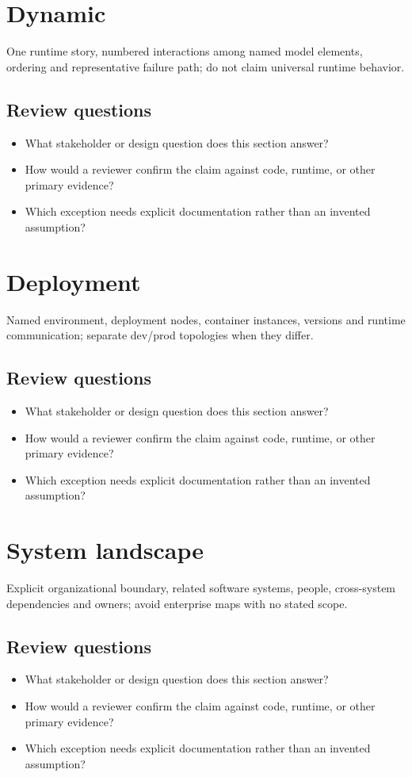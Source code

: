 \documentclass[10pt,letterpaper]{article}
\begin{document}
\section{Dynamic}
One runtime story, numbered interactions among named model elements, ordering and representative failure path; do not claim universal runtime behavior.


\subsection{Review questions}
\begin{itemize}
\item What stakeholder or design question does this section answer?
\item How would a reviewer confirm the claim against code, runtime, or other primary evidence?
\item Which exception needs explicit documentation rather than an invented assumption?
\end{itemize}

\section{Deployment}
Named environment, deployment nodes, container instances, versions and runtime communication; separate dev/prod topologies when they differ.


\subsection{Review questions}
\begin{itemize}
\item What stakeholder or design question does this section answer?
\item How would a reviewer confirm the claim against code, runtime, or other primary evidence?
\item Which exception needs explicit documentation rather than an invented assumption?
\end{itemize}

\section{System landscape}
Explicit organizational boundary, related software systems, people, cross-system dependencies and owners; avoid enterprise maps with no stated scope.


\subsection{Review questions}
\begin{itemize}
\item What stakeholder or design question does this section answer?
\item How would a reviewer confirm the claim against code, runtime, or other primary evidence?
\item Which exception needs explicit documentation rather than an invented assumption?
\end{itemize}
\end{document}
